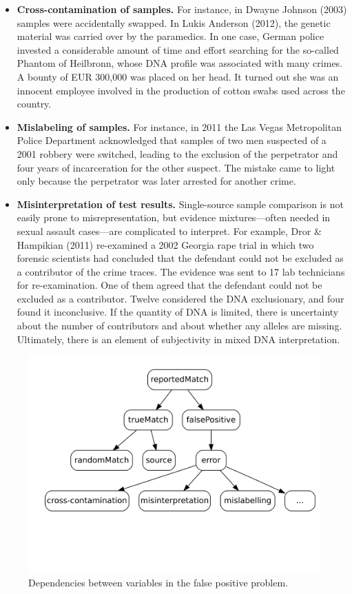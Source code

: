 \documentclass[
  letterpaper,
  DIV=11,
  numbers=noendperiod]{scrartcl}
\begin{document}
\begin{itemize}
\item
  \textbf{Cross-contamination of samples.} For instance, in Dwayne
  Johnson (2003) samples were accidentally swapped. In Lukis Anderson
  (2012), the genetic material was carried over by the paramedics. In
  one case, German police invested a considerable amount of time and
  effort searching for the so-called Phantom of Heilbronn, whose DNA
  profile was associated with many crimes. A bounty of EUR 300,000 was
  placed on her head. It turned out she was an innocent employee
  involved in the production of cotton swabs used across the country.
\item
  \textbf{Mislabeling of samples.} For instance, in 2011 the Las Vegas
  Metropolitan Police Department acknowledged that samples of two men
  suspected of a 2001 robbery were switched, leading to the exclusion of
  the perpetrator and four years of incarceration for the other suspect.
  The mistake came to light only because the perpetrator was later
  arrested for another crime.
\item
  \textbf{Misinterpretation of test results.} Single-source sample
  comparison is not easily prone to misrepresentation, but evidence
  mixtures---often needed in sexual assault cases---are complicated to
  interpret. For example, Dror \& Hampikian (2011) re-examined a 2002
  Georgia rape trial in which two forensic scientists had concluded that
  the defendant could not be excluded as a contributor of the crime
  traces. The evidence was sent to 17 lab technicians for
  re-examination. One of them agreed that the defendant could not be
  excluded as a contributor. Twelve considered the DNA exclusionary, and
  four found it inconclusive. If the quantity of DNA is limited, there
  is uncertainty about the number of contributors and about whether any
  alleles are missing. Ultimately, there is an element of subjectivity
  in mixed DNA interpretation.
\end{itemize}

\begin{center}
\begin{figure}
\includegraphics[width = 12cm]{../img/fpp.png}
\caption{Dependencies between variables in the false positive problem.}
\label{fig:fpp}
\end{figure}
\end{center}
\end{document}
